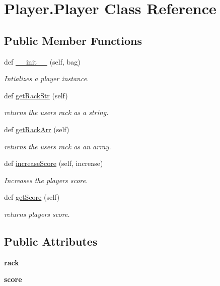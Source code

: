 \hypertarget{class_player_1_1_player}{}\section{Player.\+Player Class Reference}
\label{class_player_1_1_player}
\subsection*{Public Member Functions}
\begin{DoxyCompactItemize}
\item 
def \hyperlink{class_player_1_1_player_af2d1c87984c3a2843c09ac18e8c17eb4}{\+\_\+\+\_\+init\+\_\+\+\_\+} (self, bag)
\begin{DoxyCompactList}\small\item\em Intializes a player instance. \end{DoxyCompactList}\item 
def \hyperlink{class_player_1_1_player_a99923bc6d51c2192332fbfd13b12e307}{get\+Rack\+Str} (self)
\begin{DoxyCompactList}\small\item\em returns the users rack as a string. \end{DoxyCompactList}\item 
def \hyperlink{class_player_1_1_player_a5214d4674e59763b8eb74a977c7c14ba}{get\+Rack\+Arr} (self)
\begin{DoxyCompactList}\small\item\em returns the users rack as an array. \end{DoxyCompactList}\item 
def \hyperlink{class_player_1_1_player_ac5dad5770ed6c800f0bd5953696504d2}{increase\+Score} (self, increase)
\begin{DoxyCompactList}\small\item\em Increases the players score. \end{DoxyCompactList}\item 
def \hyperlink{class_player_1_1_player_a3671aee22ba33c5c0c794566d0fb3804}{get\+Score} (self)
\begin{DoxyCompactList}\small\item\em returns players score. \end{DoxyCompactList}\end{DoxyCompactItemize}
\subsection*{Public Attributes}
\begin{DoxyCompactItemize}
\item 
\mbox{\label{class_player_1_1_player_ac06432bf82daef882a7d53bb62dee17b}} 
{\bfseries rack}
\item 
\mbox{\label{class_player_1_1_player_aac1debbae44dad1464baf117448fd469}} 
{\bfseries score}
\end{DoxyCompactItemize}


